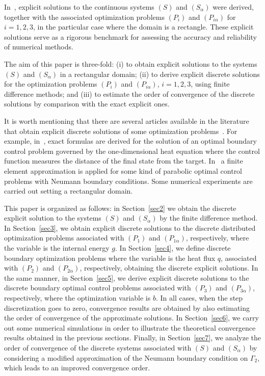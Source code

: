 \documentclass[11pt]{article}
\begin{document}
{ In~\cite{BoGaTa2020}, explicit solutions to the continuous systems $(S)$ and $(S_\alpha)$ were derived, together with  the associated optimization problems $(P_i)$ and $(P_{i\alpha})$ for $i=1,2,3$, in the particular case where the domain is a rectangle. These explicit solutions serve as a rigorous benchmark for assessing the accuracy and reliability of numerical methods.}
  
{The aim of this paper is three-fold: 
(i) to obtain explicit solutions to the systems $(S)$ and $(S_\alpha)$ in a rectangular domain; 
(ii) to derive explicit discrete solutions for the optimization problems $(P_i)$ and $(P_{i\alpha})$, $i=1,2,3$, using finite difference methods; 
and (iii) to estimate the order of convergence of the discrete solutions by comparison with the exact explicit ones.}
 
It is worth mentioning that there are several articles available in the literature that obtain explicit  discrete  solutions of some optimization problems~\cite{An1968,ArMoUg2011}. 
For example, in~\cite{LaSc2023},  exact formulas are derived for the solution of an optimal boundary control problem governed by the one-dimensional heat equation where the control function  measures the distance of the final state from the target. In~\cite{YaSu2023} a finite element approximation is applied for some kind of parabolic optimal control problems with Neumann boundary conditions. Some numerical experiments are carried out setting a rectangular domain.


This paper is organized as follows: in Section~\ref{sec2} we obtain the discrete explicit solution to the systems $(S)$ and $(S_\alpha)$ by the finite difference method. In Section~\ref{sec3}, we obtain explicit discrete solutions to the discrete distributed optimization problems associated with $(P_1)$ and $(P_{1\alpha})$, respectively, where the  variable is the internal energy $g$. 
In Section~\ref{sec4}, we define  discrete boundary optimization problems where the variable is the heat flux $q$, associated with $(P_2)$ and $(P_{2\alpha})$, respectively, obtaining the discrete explicit  solutions. In the same manner, in Section~\ref{sec5}, we derive explicit discrete solutions to the discrete boundary optimal control problems associated with $(P_3)$ and $(P_{3\alpha})$, respectively, where the optimization variable is $b$.  In all cases, when the step discretization goes to zero, convergence results are obtained by also estimating the order of convergence of the approximate solutions.
In Section~\ref{sec6}, we carry out some numerical simulations  in order to illustrate the theoretical convergence results obtained in the previous sections. Finally,  in Section~\ref{sec7}, we analyze the order of convergence of the discrete systems associated with $(S)$ and $(S_\alpha)$ by considering a modified approximation of the Neumann boundary condition on $\Gamma_2$, which leads to an improved convergence order.
 
\end{document}
